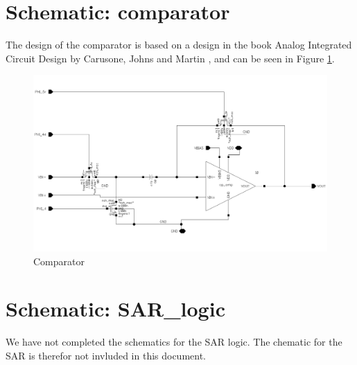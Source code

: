 \documentclass[english, a4paper,11pt]{article}
\begin{document}
\section*{Schematic: comparator}
The design of the comparator is based on a design in the book Analog Integrated Circuit Design by Carusone, Johns and Martin \cite{carusone}, and can be seen in Figure \ref{comparator}. 
\begin{figure}[!ht]
 \centering
   \includegraphics[width=\textwidth]{img/comparator}
   \caption{Comparator}
   \label{comparator}
\end{figure}


\section*{Schematic: SAR\_logic}
We have not completed the schematics for the SAR logic. The chematic for the SAR is therefor not invluded in this document.
\end{document}

